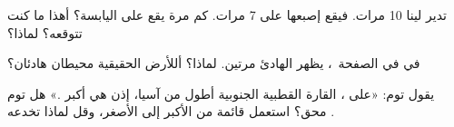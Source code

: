 \begin{exercise}[$\star\star$]\label{exo:g3:continents-and-oceans:8}
تدير لينا  10 مرات. فيقع إصبعها على  7 مرات. كم
مرة يقع على اليابسة؟ أهذا ما كنت تتوقعه؟ لماذا؟
\end{exercise}

\begin{exercise}[$\star\star$]\label{exo:g3:continents-and-oceans:9}
في  في الصفحة~\pageref{fig:g3:continents-and-oceans:world-map}،
يظهر  الهادئ مرتين. لماذا؟ أللأرض الحقيقية محيطان
هادئان؟
\end{exercise}

\begin{exercise}[$\star\star\star$]\label{exo:g3:continents-and-oceans:10}
يقول توم: «على ، القارة القطبية الجنوبية أطول من آسيا، إذن هي
أكبر .» هل توم محق؟ استعمل قائمة 
من الأكبر إلى الأصغر، وقل لماذا تخدعه .
\end{exercise}
